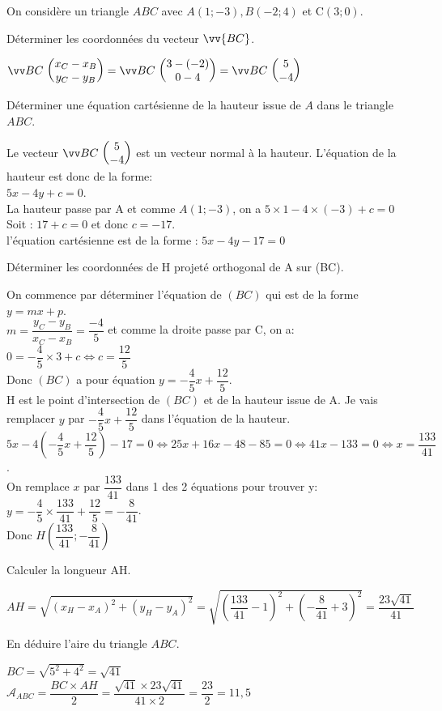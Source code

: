 \documentclass[11pt,a4paper]{article}  %
\begin{document}
\exerciceDS{} %
On considère un triangle $A B C$ avec $A(1 ;-3), B(-2 ; 4)$ et $\mathrm{C}(3 ; 0)$.
\begin{enumMet}
	\item Déterminer les coordonnées du vecteur $\vv{B C}$.
	\begin{corrBox}
		$\Coord{BC}{x_C-x_B}{y_C-y_B}=\Coord{BC}{3-(-2)}{0-4}=\Coord{BC}{5}{-4}$
	\end{corrBox}
	\item Déterminer une équation cartésienne de la hauteur issue de $A$ dans le triangle $A B C$.
	\begin{corrBox}
		Le vecteur $\Coord{BC}{5}{-4}$ est un vecteur normal à la hauteur. L'équation de la hauteur est donc de la forme:\\
		$5x-4y+c=0$.\\
		La hauteur passe par A et comme $A(1 ;-3)$, on a $5\times1-4\times(-3)+c=0$\\
		Soit : $17+c=0$ et donc $c=-17$.\\
		l'équation cartésienne est de la forme : $5x-4y-17=0$
	\end{corrBox}
	\item Déterminer les coordonnées de $\mathrm{H}$ projeté orthogonal de A sur (BC).
	\begin{corrBox}
		On commence par déterminer l'équation de $(BC)$ qui est de la forme $y=mx+p$.\\
		$m=\dfrac{y_C-y_B}{x_C-x_B}=\dfrac{-4}{5}$ et comme la droite passe par C, on a:\\
		$0=-\dfrac{4}{5}\times3+c \iff c=\dfrac{12}{5}$\\
		Donc $(BC)$ a pour équation $y=-\dfrac{4}{5}x+\dfrac{12}{5}$.\\
		H est le point d'intersection de $(BC)$ et de la hauteur issue de A. Je vais remplacer $y$ par $-\dfrac{4}{5}x+\dfrac{12}{5}$ dans l'équation de la hauteur.\\
		$5x-4\left(-\dfrac{4}{5}x+\dfrac{12}{5}\right)-17=0 \iff 25x+16x-48-85=0 \iff 41x-133=0 \iff x=\dfrac{133}{41}$.\\
		On remplace $x$ par $\dfrac{133}{41}$ dans 1 des 2 équations pour trouver y:\\
		$y=-\dfrac{4}{5}\times \dfrac{133}{41}+\dfrac{12}{5}=-\dfrac{8}{41}$.\\
		Donc $H\left(\dfrac{133}{41}; -\dfrac{8}{41}\right)$
	\end{corrBox}
	\item Calculer la longueur $\mathrm{AH}$.
	\begin{corrBox}
		$AH=\sqrt{(x_H-x_A)^2+(y_H-y_A)^2}=\sqrt{\left(\dfrac{133}{41}-1\right)^2+\left(-\dfrac{8}{41}+3\right)^2}=\dfrac{23\sqrt{41}}{41}$
	\end{corrBox}
	\item En déduire l'aire du triangle $A B C$.
	\begin{corrBox}
		$BC=\sqrt{5^2+4^2}=\sqrt{41}$\\
		$\mathrm{\mathscr{A}}_{ABC}=\dfrac{BC\times AH}{2}=\dfrac{\sqrt{41}\times 23\sqrt{41}}{41\times2}=\dfrac{23}{2}=11,5$
	\end{corrBox}
\end{enumMet}
\end{document}
